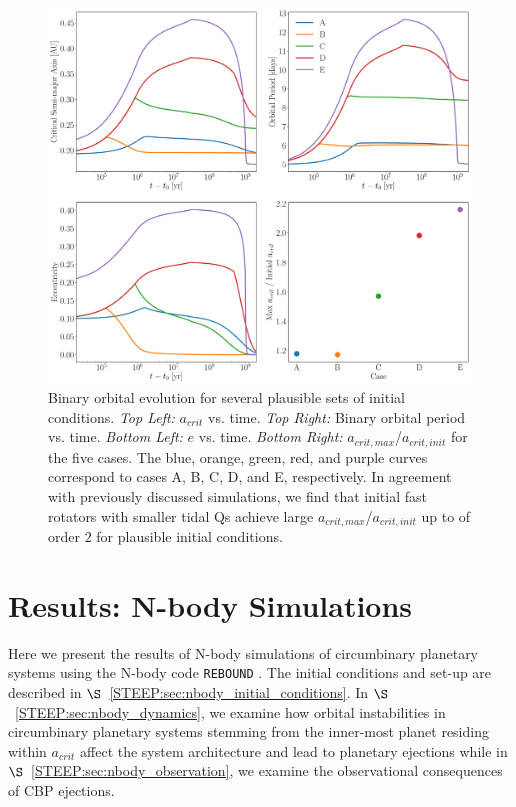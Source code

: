 \begin{figure}
	\includegraphics[width=\columnwidth]{opt.pdf}
   \caption{Binary orbital evolution for several plausible sets of initial conditions. {\it Top Left:} $a_{crit}$ vs. time.  {\it Top Right:} Binary orbital period vs. time. {\it Bottom Left:} $e$ vs. time. {\it Bottom Right:} $a_{crit,max}$/$a_{crit,init}$ for the five cases.  The blue, orange, green, red, and purple curves correspond to cases A, B, C, D, and E, respectively.  In agreement with previously discussed simulations, we find that initial fast rotators with smaller tidal Qs achieve large $a_{crit,max}$/$a_{crit,init}$ up to of order $2$ for plausible initial conditions.}
    \label{STEEP:fig:opt}
\end{figure}

\section{Results: N-body Simulations} \label{STEEP:sec:nbody_results}

Here we present the results of N-body simulations of circumbinary planetary systems using the N-body code \texttt{REBOUND} \citep{Rein2012,Rein2015}.  The initial conditions and set-up are described in $\S$~\ref{STEEP:sec:nbody_initial_conditions}.  In $\S$~\ref{STEEP:sec:nbody_dynamics}, we examine how orbital instabilities in circumbinary planetary systems stemming from the inner-most planet residing within $a_{crit}$ affect the system architecture and lead to planetary ejections while in $\S$~\ref{STEEP:sec:nbody_observation}, we examine the observational consequences of CBP ejections.

